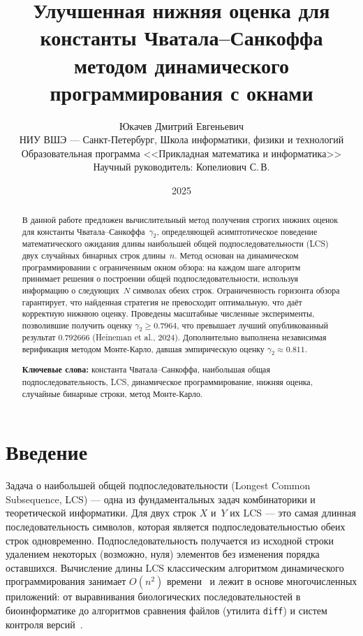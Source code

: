 \documentclass[12pt,a4paper]{article}
\title{%
  Улучшенная нижняя оценка для константы Чватала--Санкоффа\\
  методом динамического программирования с окнами%
}
\author{%
  Юкачев Дмитрий Евгеньевич\\
  \small НИУ ВШЭ --- Санкт-Петербург, Школа информатики, физики и технологий\\
  \small Образовательная программа <<Прикладная математика и информатика>>\\
  \small Научный руководитель: Копелиович С.\,В.%
}
\date{2025}
\begin{document}
\maketitle

\begin{abstract}
В данной работе предложен вычислительный метод получения строгих нижних оценок для константы Чватала--Санкоффа~$\gamma_2$, определяющей асимптотическое поведение математического ожидания длины наибольшей общей подпоследовательности (LCS) двух случайных бинарных строк длины~$n$.
Метод основан на динамическом программировании с ограниченным окном обзора: на каждом шаге алгоритм принимает решения о построении общей подпоследовательности, используя информацию о следующих~$N$ символах обеих строк.
Ограниченность горизонта обзора гарантирует, что найденная стратегия не превосходит оптимальную, что даёт корректную нижнюю оценку.
Проведены масштабные численные эксперименты, позволившие получить оценку $\gamma_2 \geq 0.7964$, что превышает лучший опубликованный результат $0.792666$ (Heineman et al., 2024).
Дополнительно выполнена независимая верификация методом Монте-Карло, давшая эмпирическую оценку $\gamma_2 \approx 0.811$.

\medskip\noindent
\textbf{Ключевые слова:} константа Чватала--Санкоффа, наибольшая общая подпоследовательность, LCS, динамическое программирование, нижняя оценка, случайные бинарные строки, метод Монте-Карло.
\end{abstract}

\section{Введение}

Задача о наибольшей общей подпоследовательности (Longest Common Subsequence, LCS) --- одна из фундаментальных задач комбинаторики и теоретической информатики.
Для двух строк $X$ и~$Y$ их LCS --- это самая длинная последовательность символов, которая является подпоследовательностью обеих строк одновременно.
Подпоследовательность получается из исходной строки удалением некоторых (возможно, нуля) элементов без изменения порядка оставшихся.
Вычисление длины LCS классическим алгоритмом динамического программирования занимает $O(n^2)$ времени~\cite{hirschberg1977} и лежит в основе многочисленных приложений: от выравнивания биологических последовательностей в биоинформатике до алгоритмов сравнения файлов (утилита \texttt{diff}) и систем контроля версий~\cite{chvatal1975}.
\end{document}
